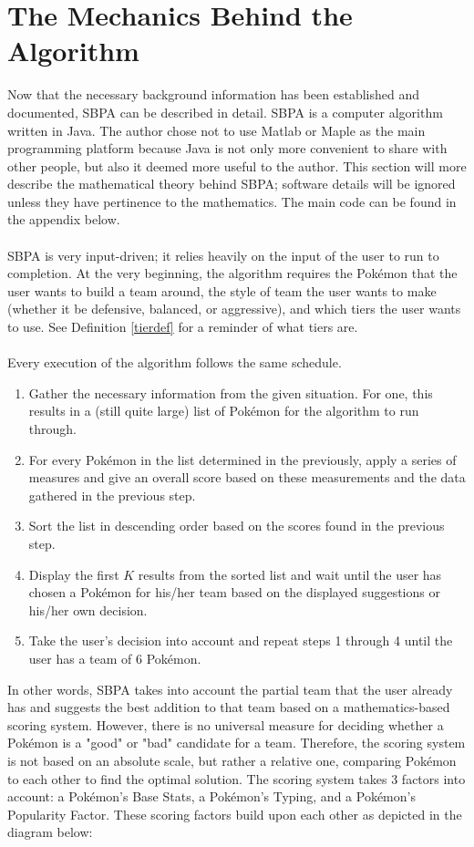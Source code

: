 \documentclass{article}
\begin{document}
\section{The Mechanics Behind the Algorithm}
Now that the necessary background information has been established and documented, SBPA can be described in detail. SBPA is a computer algorithm written in Java. The author chose not to use Matlab or Maple as the main programming platform because Java is not only more convenient to share with other people, but also it deemed more useful to the author. This section will more describe the mathematical theory behind SBPA; software details will be ignored unless they have pertinence to the mathematics. The main code can be found in the appendix below.\\\\
SBPA is very input-driven; it relies heavily on the input of the user to run to completion. At the very beginning, the algorithm requires the Pok\'emon that the user wants to build a team around, the style of team the user wants to make (whether it be defensive, balanced, or aggressive), and which tiers the user wants to use. See Definition \ref{tierdef} for a reminder of what tiers are.\\\\
Every execution of the algorithm follows the same schedule.
\begin{enumerate}
	\item Gather the necessary information from the given situation. For one, this results in a (still quite large) list of Pok\'emon for the algorithm to run through.
	\item For every Pok\'emon in the list determined in the previously, apply a series of measures and give an overall score based on these measurements and the data gathered in the previous step.
	\item Sort the list in descending order based on the scores found in the previous step.
	\item Display the first $K$ results from the sorted list and wait until the user has chosen a Pok\'emon for his/her team based on the displayed suggestions or his/her own decision.
	\item Take the user's decision into account and repeat steps 1 through 4 until the user has a team of 6 Pok\'emon.
\end{enumerate}
In other words, SBPA takes into account the partial team that the user already has and suggests the best addition to that team based on a mathematics-based scoring system. However, there is no universal measure for deciding whether a Pok\'emon is a "good" or "bad" candidate for a team. Therefore, the scoring system is not based on an absolute scale, but rather a relative one, comparing Pok\'emon to each other to find the optimal solution. The scoring system takes 3 factors into account: a Pok\'emon's Base Stats, a Pok\'emon's Typing, and a Pok\'emon's Popularity Factor. These scoring factors build upon each other as depicted in the diagram below:
\begin{center}
\end{center}
\end{document}
